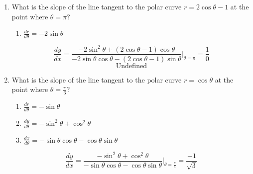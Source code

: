 \documentclass[12pt]{article}
\begin{document}
\begin{enumerate}
	\item What is the slope of the line tangent to the polar curve $r = 2 \cos \theta -1$ at the point where $\theta = \pi$?
	      \begin{enumerate}
	      	\item $\frac{dr}{d\theta} = -2\sin\theta$
	      \end{enumerate}
	      $$\frac{dy}{dx} = \frac{-2\sin^2\theta + (2 \cos \theta -1)\cos\theta}{-2\sin\theta\cos\theta - (2 \cos \theta -1)\sin\theta}\biggr\rvert_{\theta = \pi} = \boxed{\frac{1}{0}}$$
	      $$\boxed{\text{Undefined}}$$ 
	\item What is the slope of the line tangent to the polar curve $r=\cos \theta$ at the point where $\theta = \frac{\pi}{6}$?
	      \begin{enumerate}
	      	\item $\frac{dr}{d\theta} = -\sin \theta$
	      	\item $\frac{dy}{d\theta} = -\sin^2\theta+\cos^2\theta $
	      	\item $\frac{dx}{d\theta}=-\sin \theta \cos \theta - \cos \theta\sin \theta$
	      \end{enumerate}
	      $$\frac{dy}{dx} = \frac{-\sin^2\theta+\cos^2\theta}{-\sin \theta \cos \theta - \cos \theta\sin \theta}\biggr\rvert_{\theta = \frac{\pi}{6}} = \boxed{\frac{-1}{\sqrt{3}}}$$
\end{enumerate}
\end{document}
